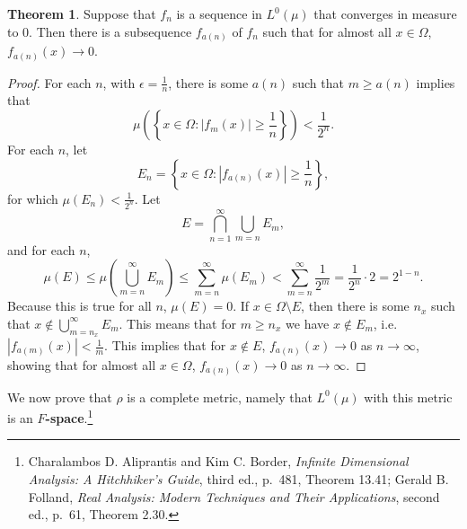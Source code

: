 \documentclass{article}
\theoremstyle{definition}
\newtheorem{theorem}{Theorem}
\theoremstyle{definition}
\begin{document}
\begin{theorem}
Suppose that $f_n$ is a sequence in $L^0(\mu)$ that converges in measure to $0$.
Then there is a subsequence $f_{a(n)}$ of $f_n$ such that for almost all
$x \in \Omega$, $f_{a(n)}(x) \to 0$.
\end{theorem}
\begin{proof}
For each $n$,
with $\epsilon=\frac{1}{n}$,
there is some $a(n)$ such that
$m \geq a(n)$ implies that
\[
\mu\left(\left\{x \in \Omega: |f_m(x)| \geq \frac{1}{n}\right\}\right)<
\frac{1}{2^n}.
\]
For each $n$, let
\[
E_n = \left\{x \in \Omega: |f_{a(n)}(x)| \geq \frac{1}{n} \right\},
\]
for which $\mu(E_n)<\frac{1}{2^n}$. 
Let
\[
E = \bigcap_{n=1}^\infty \bigcup_{m=n} E_m,
\]
and for each $n$,
\[
\mu(E) \leq \mu \left( \bigcup_{m=n}^\infty E_m \right) 
\leq \sum_{m=n}^\infty \mu(E_m) < \sum_{m=n}^\infty \frac{1}{2^m} =  
\frac{1}{2^n} \cdot 2 = 2^{1-n}.
\]
Because this is true for all $n$, $\mu(E)=0$. If
$x \in \Omega \setminus E$, then there is some $n_x$ such that
$x \not \in \bigcup_{m=n_x}^\infty E_m$. This means that
for $m \geq n_x$ we have $x \not \in E_m$, i.e.
$|f_{a(m)}(x)|<\frac{1}{m}$. This implies that for
$x \not \in E$, 
$f_{a(n)}(x) \to 0$ as $n \to \infty$, showing that
for almost all $x \in \Omega$, $f_{a(n)}(x) \to 0$ as
$n \to \infty$. 
\end{proof}


We now prove that
$\rho$ is a complete metric, namely that $L^0(\mu)$ with this metric is an \textbf{$F$-space}.\footnote{Charalambos D. 
Aliprantis and Kim C. Border, {\em Infinite Dimensional Analysis: A Hitchhiker's Guide}, third ed., p.~481,
Theorem 13.41;
Gerald B. Folland, {\em Real Analysis: Modern Techniques and Their Applications}, second ed., p.~61, Theorem 2.30.} 
\end{document}
